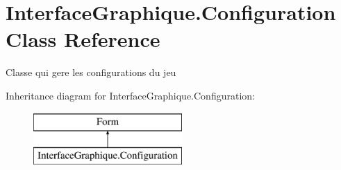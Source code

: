 \hypertarget{class_interface_graphique_1_1_configuration}{\section{Interface\-Graphique.\-Configuration Class Reference}
\label{class_interface_graphique_1_1_configuration}
}


Classe qui gere les configurations du jeu  


Inheritance diagram for Interface\-Graphique.\-Configuration\-:\begin{figure}[H]
\begin{center}
\leavevmode
\includegraphics[height=2.000000cm]{class_interface_graphique_1_1_configuration}
\end{center}
\end{figure}
